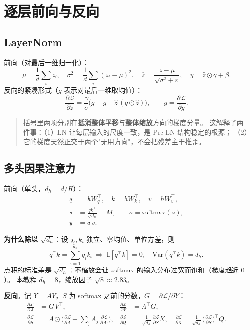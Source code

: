 \documentclass[11pt,a4paper]{ctexart}
\begin{document}
\section{逐层前向与反向}

\subsection{LayerNorm}

前向（对最后一维归一化）：
\begin{equation}
  \mu=\frac1d\sum_i z_i,\quad \sigma^2=\frac1d\sum_i(z_i-\mu)^2,\quad
  \hat z=\frac{z-\mu}{\sqrt{\sigma^2+\varepsilon}},\quad y=\hat z\odot\gamma+\beta .
\end{equation}
反向的紧凑形式（$\bar g$ 表示对最后一维取均值）：
\begin{equation}
  \frac{\partial\mathcal{L}}{\partial z}
  =\frac{\gamma}{\sigma}\Big(g-\bar g-\hat z\,\overline{(g\odot\hat z)}\Big),
  \qquad g=\frac{\partial\mathcal{L}}{\partial y}.
  \label{eq:lnback}
\end{equation}

\begin{quote}
括号里两项分别在\textbf{抵消整体平移}与\textbf{整体缩放}方向的梯度分量。
这解释了两件事：（1）LN 让每层输入的尺度一致，是 Pre-LN 结构稳定的根源；
（2）它的梯度天然正交于两个"无用方向"，不会把残差主干推歪。
\end{quote}

\subsection{多头因果注意力}

前向（单头，$d_h=d/H$）：
\begin{align}
  q&=hW_q^\top,\quad k=hW_k^\top,\quad v=hW_v^\top,\\
  s&=\frac{qk^\top}{\sqrt{d_h}}+M,\qquad a=\mathrm{softmax}(s),\\
  y&=a\,v .
\end{align}

\textbf{为什么除以 $\sqrt{d_h}$}：设 $q_i,k_i$ 独立、零均值、单位方差，则
\begin{equation}
  q^\top k=\sum_{i=1}^{d_h}q_ik_i\ \Rightarrow\
  \mathbb{E}[q^\top k]=0,\quad \mathrm{Var}(q^\top k)=d_h .
\end{equation}
点积的标准差是 $\sqrt{d_h}$；不缩放会让 softmax 的输入分布过宽而饱和（梯度趋近 $0$）。
本教程 $d_h=8$，缩放因子 $\sqrt8\approx2.83$。

\textbf{反向}。记 $Y=AV$，$S$ 为 softmax 之前的分数，$G=\partial\mathcal{L}/\partial Y$：
\begin{align}
  \frac{\partial\mathcal{L}}{\partial A}&=G\,V^\top, &
  \frac{\partial\mathcal{L}}{\partial V}&=A^\top G,\\
  \frac{\partial\mathcal{L}}{\partial S}&=A\odot\Big(\frac{\partial\mathcal{L}}{\partial A}
   -\sum_j A_{j}\,\frac{\partial\mathcal{L}}{\partial A_{j}}\Big), &
  \frac{\partial\mathcal{L}}{\partial Q}&=\frac{1}{\sqrt{d_h}}\frac{\partial\mathcal{L}}{\partial S}K,\quad
  \frac{\partial\mathcal{L}}{\partial K}=\frac{1}{\sqrt{d_h}}\Big(\frac{\partial\mathcal{L}}{\partial S}\Big)^\top Q .
\end{align}
\end{document}
